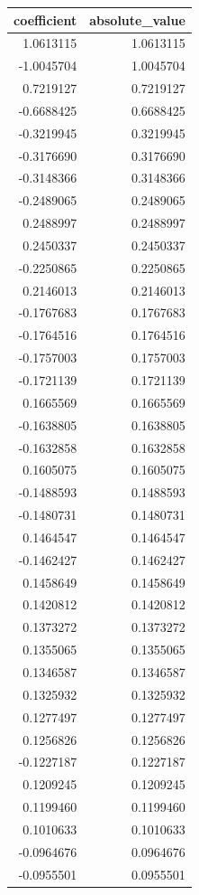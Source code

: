 \documentclass[
]{article}
\begin{document}
\begin{longtable}[]{@{}rr@{}}
\toprule
coefficient & absolute\_value \\
\midrule
\endhead
1.0613115 & 1.0613115 \\
-1.0045704 & 1.0045704 \\
0.7219127 & 0.7219127 \\
-0.6688425 & 0.6688425 \\
-0.3219945 & 0.3219945 \\
-0.3176690 & 0.3176690 \\
-0.3148366 & 0.3148366 \\
-0.2489065 & 0.2489065 \\
0.2488997 & 0.2488997 \\
0.2450337 & 0.2450337 \\
-0.2250865 & 0.2250865 \\
0.2146013 & 0.2146013 \\
-0.1767683 & 0.1767683 \\
-0.1764516 & 0.1764516 \\
-0.1757003 & 0.1757003 \\
-0.1721139 & 0.1721139 \\
0.1665569 & 0.1665569 \\
-0.1638805 & 0.1638805 \\
-0.1632858 & 0.1632858 \\
0.1605075 & 0.1605075 \\
-0.1488593 & 0.1488593 \\
-0.1480731 & 0.1480731 \\
0.1464547 & 0.1464547 \\
-0.1462427 & 0.1462427 \\
0.1458649 & 0.1458649 \\
0.1420812 & 0.1420812 \\
0.1373272 & 0.1373272 \\
0.1355065 & 0.1355065 \\
0.1346587 & 0.1346587 \\
0.1325932 & 0.1325932 \\
0.1277497 & 0.1277497 \\
0.1256826 & 0.1256826 \\
-0.1227187 & 0.1227187 \\
0.1209245 & 0.1209245 \\
0.1199460 & 0.1199460 \\
0.1010633 & 0.1010633 \\
-0.0964676 & 0.0964676 \\
-0.0955501 & 0.0955501 \\

\end{longtable}
\end{document}
